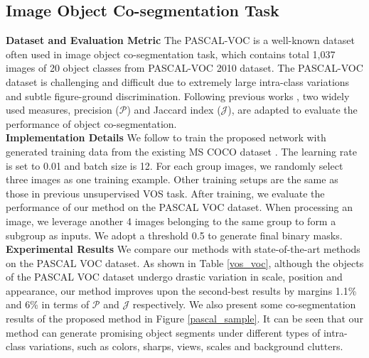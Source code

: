 \documentclass[runningheads]{llncs}
\begin{document}
\subsection{Image Object Co-segmentation Task}\label{exp_iocs}
\textbf{Dataset and Evaluation Metric}  The PASCAL-VOC \cite{coseg_faktor13}  is a well-known dataset often used in image object co-segmentation task, which contains total 1,037 images of 20 object classes from PASCAL-VOC 2010 dataset. The PASCAL-VOC dataset is challenging and difficult due to extremely large intra-class variations and subtle figure-ground discrimination.  Following previous works \cite{coseg_faktor13,coseg_lee15,coseg_chang15,coseg_Jerripothula16,coseg_li19}, two widely used measures, precision ($\mathcal{P}$) and Jaccard index ($\mathcal{J}$), are adapted to evaluate the performance of object co-segmentation. \\
\noindent \textbf{Implementation Details} We follow \cite{coseg_groupsem,coseg_li19} to train the proposed network  with generated training data from the existing MS COCO dataset \cite{mscoco}. The learning rate is set to 0.01 and batch size is 12. For each group images, we randomly select three images as one training example. Other training setups are the same as those in previous unsupervised VOS task. After training, we evaluate the performance of our method on the PASCAL VOC dataset. When processing an image, we leverage another 4 images belonging to the same group to form a subgroup as inputs. We adopt a threshold 0.5 to generate final binary  masks.\\
\noindent \textbf{Experimental Results}  We compare our methods with state-of-the-art methods on the PASCAL VOC dataset. As shown in Table \ref{vos_voc}, although the objects of the PASCAL VOC dataset undergo drastic variation in scale, position and appearance, our method improves upon the second-best results \cite{coseg_li19} by margins  1.1\% and 6\% in terms of $\mathcal{P}$ and $\mathcal{J}$ respectively. We also present some co-segmentation results of the proposed method in Figure \ref{pascal_sample}. It can be seen that our method can generate promising object segments under different types of intra-class variations, such as colors, sharps, views, scales and background clutters.
\end{document}
